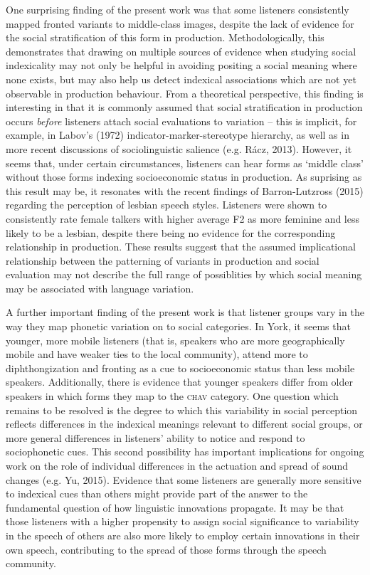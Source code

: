 \documentclass[PWPL]{article}
\begin{document}
One surprising finding of the present work was that some listeners consistently mapped fronted  variants to middle-class images, despite the lack of evidence for the social stratification of this form in production. Methodologically, this demonstrates that drawing on multiple sources of evidence when studying social indexicality may not only be helpful in avoiding positing a social meaning where none exists, but may also help us detect indexical associations which are not yet observable in production behaviour. From a theoretical perspective, this finding is interesting in that it is commonly assumed that social stratification in production occurs \textit{before} listeners attach social evaluations to variation -- this is implicit, for example, in Labov's (1972) indicator-marker-stereotype hierarchy, as well as in more recent discussions of sociolinguistic salience (e.g. R\'acz, 2013). However, it seems that, under certain circumstances, listeners can hear forms as `middle class' without those forms indexing socioeconomic status in production. As suprising as this result may be, it resonates with the recent findings of Barron-Lutzross (2015) regarding the perception of lesbian speech styles. Listeners were shown to consistently rate female talkers with higher average F2 as more feminine and less likely to be a lesbian, despite there being no evidence for the corresponding relationship in production. These results suggest that the assumed implicational relationship between the patterning of variants in production and social evaluation may not describe the full range of possiblities by which social meaning may be associated with language variation.

A further important finding of the present work is that listener groups vary in the way they map phonetic variation on to social categories. In York, it seems that younger, more mobile listeners (that is, speakers who are more geographically mobile and have weaker ties to the local community), attend more to  diphthongization and  fronting as a cue to socioeconomic status than less mobile speakers. Additionally, there is evidence that younger speakers differ from older speakers in which forms they map to the \textsc{chav} category. One question which remains to be resolved is the degree to which this variability in social perception reflects differences in the indexical meanings relevant to different social groups, or more general differences in listeners' ability to notice and respond to sociophonetic cues. This second possibility has important implications for ongoing work on the role of individual differences in the actuation and spread of sound changes (e.g. Yu, 2015). Evidence that some listeners are generally more sensitive to indexical cues than others might provide part of the answer to the fundamental question of how linguistic innovations propagate. It may be that those listeners with a higher propensity to assign social significance to variability in the speech of others are also more likely to employ certain innovations in their own speech, contributing to the spread of those forms through the speech community.


\nocite{*}

\end{document}
